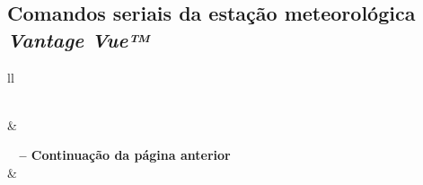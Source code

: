 \begin{anexosenv}
\chapter{Comandos seriais da estação meteorológica \textit{Vantage Vue™}} \label{anex:anexo1}

\begin{center}
\begin{longtable}{ll}
\caption{Comandos seriais suportados pela estação meteorológica \textit{Vantage Vue™}}\\
\hline
{} &  \\ \hline
\endfirsthead

%
{{\bfseries \tablename\ \thetable{} -- Continuação da página anterior}} \\

\hline
{} &  \\ \hline
\endhead

 \\
\endfoot

\endlastfoot


\end{longtable}
\end{center}
\end{anexosenv}

